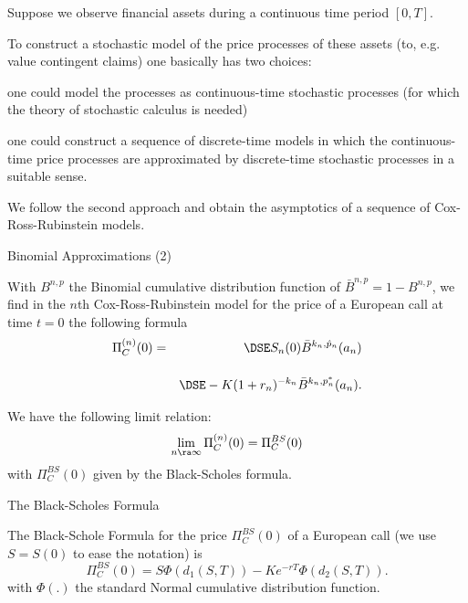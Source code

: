 



	Suppose we observe financial assets during a continuous time
period $[0,T]$.


	To construct a stochastic model of the price
processes of these assets (to, e.g. value contingent claims) one
basically has two choices:






	one could model the processes as
continuous-time stochastic processes (for which the theory of
stochastic calculus is needed)


	one could construct a sequence of discrete-time models in which
the continuous-time price processes are approximated by
discrete-time stochastic processes in a suitable sense.






	We follow the second approach and obtain the asymptotics
 of a sequence of Cox-Ross-Rubinstein models.





{Binomial Approximations (2)}







	
 With $B^{n, p}$ the Binomial cumulative distribution function of
 $\bar{B}^{n, p} = 1- B^{n, p}$, we find in the $n$th
Cox-Ross-Rubinstein model for the price of a European call at time
$t=0$ the following formula
\begin{eqnarray}\label{crrpricen}
\Pi_C^{(n)}(0) &=&\DSE S_n(0) \bar{B}^{k_n, \hat{p}_n}(a_n)\\*[12pt]\nonumber
&&\DSE- K
(1+r_n)^{-k_n} \bar{B}^{k_n, p^*_n}(a_n).
\end{eqnarray}


	We have the following limit relation:
$$
\lim_{n \ra \infty} \Pi_C^{(n)}(0) = \Pi_C^{BS}(0)
$$
with $\Pi_C^{BS}(0)$ given by the Black-Scholes formula.





{The Black-Scholes Formula}







	The Black-Schole Formula for the price $\Pi_C^{BS}(0)$ of a European call  (we use
$S=S(0)$ to ease the notation) is
\begin{equation}\label{BScallprice4}
\Pi_C^{BS}(0) = S \Phi(d_1(S, T)) - K e^{-rT} \Phi(d_2(S, T)).
\end{equation}
with $\Phi(.)$ the standard Normal cumulative distribution function.


